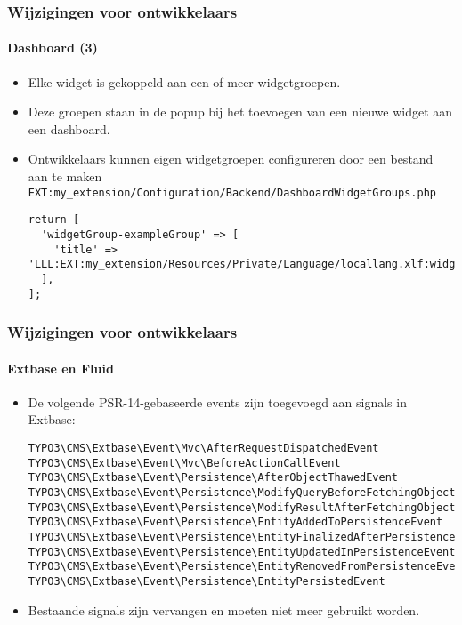 \begin{frame}[fragile]
	\frametitle{Wijzigingen voor ontwikkelaars}
	\framesubtitle{Dashboard (3)}

	\lstset{basicstyle=\tiny\ttfamily}

	\begin{itemize}
		\item Elke widget is gekoppeld aan een of meer widgetgroepen.
		\item Deze groepen staan in de popup bij het toevoegen van een nieuwe widget aan een dashboard.
		\item Ontwikkelaars kunnen eigen widgetgroepen configureren door een bestand aan te maken\newline
			\smaller
				\texttt{EXT:my\_extension/Configuration/Backend/DashboardWidgetGroups.php}
			\normalsize

\vspace{-0.4cm}
\begin{lstlisting}
return [
  'widgetGroup-exampleGroup' => [
    'title' => 'LLL:EXT:my_extension/Resources/Private/Language/locallang.xlf:widget_group_name',
  ],
];
\end{lstlisting}

	\end{itemize}

\end{frame}


\begin{frame}[fragile]
	\frametitle{Wijzigingen voor ontwikkelaars}
	\framesubtitle{Extbase en Fluid}

	\lstset{basicstyle=\tiny\ttfamily}

	\begin{itemize}
		\item De volgende PSR-14-gebaseerde events zijn toegevoegd aan signals in Extbase:

\vspace{-0.4cm}
\begin{lstlisting}
TYPO3\CMS\Extbase\Event\Mvc\AfterRequestDispatchedEvent
TYPO3\CMS\Extbase\Event\Mvc\BeforeActionCallEvent
TYPO3\CMS\Extbase\Event\Persistence\AfterObjectThawedEvent
TYPO3\CMS\Extbase\Event\Persistence\ModifyQueryBeforeFetchingObjectDataEvent
TYPO3\CMS\Extbase\Event\Persistence\ModifyResultAfterFetchingObjectDataEvent
TYPO3\CMS\Extbase\Event\Persistence\EntityAddedToPersistenceEvent
TYPO3\CMS\Extbase\Event\Persistence\EntityFinalizedAfterPersistenceEvent
TYPO3\CMS\Extbase\Event\Persistence\EntityUpdatedInPersistenceEvent
TYPO3\CMS\Extbase\Event\Persistence\EntityRemovedFromPersistenceEvent
TYPO3\CMS\Extbase\Event\Persistence\EntityPersistedEvent
\end{lstlisting}

		\item Bestaande signals zijn vervangen en moeten niet meer gebruikt worden.

	\end{itemize}

\end{frame}

